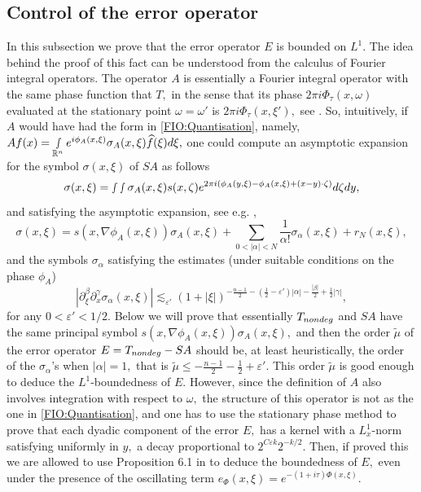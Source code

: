 \documentclass[12pt, reqno]{amsart}
\theoremstyle{definition}
\theoremstyle{remark}
\numberwithin{equation}{section}
\begin{document}
\subsection{Control of the error operator}\label{L1:boundedness:remaninder} In this subsection we prove that the error operator $E$ is bounded on $L^{1}.$ The idea behind the proof of this fact can be understood from the calculus of Fourier integral operators. The operator $A$ is essentially a Fourier integral operator with the same phase function that $T,$ in the sense that its phase $2\pi i\Phi_\tau(x,\omega)$ evaluated at the stationary point $\omega=\omega'$ is $2\pi i\Phi_\tau(x,\xi'),$ see \cite[Page 19, Eq. (16)]{Tao}. So, intuitively, if $A$ would have  had  the form in \eqref{FIO:Quantisation}, namely, $Af(x)=\smallint\limits_{\mathbb{R}^n}e^{i\phi_A(x,\xi)}\sigma_A(x,\xi)\widehat{f}(\xi)d\xi,$  one could compute an asymptotic expansion for the symbol $\sigma(x,\xi)$ of $SA$ as follows 
\begin{equation}
    \sigma(x,\xi)=\smallint\smallint \sigma_A(x,\xi)s(x,\zeta)e^{2\pi i(\phi_A(y,\xi)-\phi_A(x,\xi)+(x-y)\cdot \zeta) }d\zeta dy,
\end{equation} and satisfying the asymptotic expansion, see e.g. \cite[Page 17]{Staubach},
\begin{equation}
   \sigma(x,\xi)=s(x,\nabla\phi_A(x,\xi))\sigma_A(x,\xi)+\sum_{0<|\alpha|<N}\frac{1}{\alpha!}\sigma_{\alpha}(x,\xi)+r_{N}(x,\xi), 
\end{equation}and the symbols $\sigma_{\alpha}$ satisfying the estimates (under suitable conditions on the phase $\phi_A$)
$$|\partial_{\xi}^{\beta}\partial_x^{\gamma}\sigma_\alpha(x,\xi)|\lesssim_{\varepsilon'} (1+|\xi|)^{-\frac{n-1}{2}-(\frac{1}{2}-\varepsilon')|\alpha|-\frac{|\beta|}{2} +\frac{1}{2}|\gamma|},$$ for any $0<\varepsilon'<1/2.$
Below we will prove that essentially $T_{\textnormal{nondeg}}$ and $SA$ have the same principal symbol $s(x,\nabla\phi_A(x,\xi))\sigma_A(x,\xi),$ and then the order $\tilde{\mu}$ of the error operator $E=T_{\textnormal{nondeg}}-SA$  should be, at least heuristically,  the order of the $\sigma_{\alpha}$'s when $|\alpha|=1,$ that is $\tilde{\mu}\leq -\frac{n-1}{2}-\frac{1}{2}+\varepsilon'. $ This order $\tilde{\mu}$ is good enough to deduce the $L^1$-boundedness of $E.$ However, since the definition of $A$  also involves integration with respect to $\omega,$ the structure of this operator is not as the one in \eqref{FIO:Quantisation}, and one has to use the stationary phase method to prove that each dyadic component of the error $E,$ has a kernel with a  $L^1_x$-norm satisfying uniformly in $y,$ a decay proportional to $2^{C\varepsilon k}2^{-k/2}.$ Then, if proved this we are allowed to use Proposition 6.1 in \cite[Page 17]{Tao} to deduce the boundedness of $E,$ even under the presence of the oscillating term $e_{\Phi}(x,\xi)=e^{-(1+i\tau)\Phi(x,\xi)}.$
\end{document}
